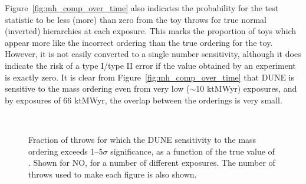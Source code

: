 Figure~\ref{fig:mh_comp_over_time} also indicates the probability for the test statistic \dchisq to be less (more) than zero from the toy throws for true normal (inverted) hierarchies at each exposure. This marks the proportion of toys which appear more like the incorrect ordering than the true ordering for the toy. However, it is not easily converted to a single number sensitivity, although it does indicate the risk of a type I/type II error if the \dchisq value obtained by an experiment is exactly zero. It is clear from Figure~\ref{fig:mh_comp_over_time} that DUNE is sensitive to the mass ordering even from very low ($\sim$10 ktMWyr) exposures, and by exposures of 66 ktMWyr, the overlap between the orderings is very small.

\begin{figure*}[htbp]
  \centering
  \\
  \caption{Fraction of throws for which the DUNE sensitivity to the mass ordering exceeds 1--5$\sigma$ significance, as a function of the true value of \deltacp. Shown for NO, for a number of different exposures. The number of throws used to make each figure is also shown.}
  \label{fig:mh_nh_over_time}
\end{figure*}

